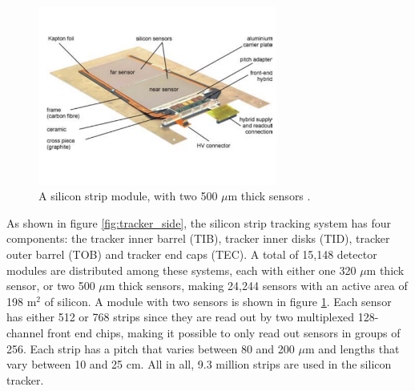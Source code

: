 \begin{figure}[h]
   \centering
  \includegraphics[width=0.7\textwidth]{Figures/CMS_Diagrams/Tracker__Silicon_Strip_Module.pdf}
  \caption{A silicon strip module, with two 500 $\mu$m thick sensors
    \cite{CMS:CMS_Machine_Chatrchyan:2008aa}.} \label{fig:tracker_strip_module} 
\end{figure}

\par As shown in figure \ref{fig:tracker_side}, the silicon strip
tracking system has four components: the tracker inner barrel (TIB),
tracker inner disks (TID), tracker outer barrel (TOB) and tracker end
caps (TEC).  A total of 15,148 detector modules are distributed among
these systems, each with either one 320 $\mu$m thick sensor, or two
500 $\mu$m thick sensors, making 24,244 sensors with an active area of
198 m$^{2}$ of silicon.  A module with two sensors is shown in figure
\ref{fig:tracker_strip_module}.  Each sensor has either 512 or 768 strips
since they are read out by two multiplexed 128-channel front end
chips, making it possible to only read out sensors in groups of 256.
Each strip has a pitch that varies between 80 and 200 $\mu$m and
lengths that vary between 10 and 25 cm.  All in all, 9.3 million
strips are used in the silicon tracker.  

